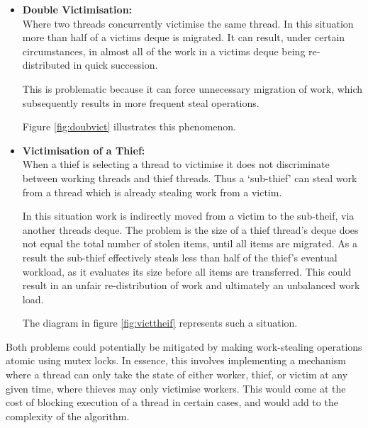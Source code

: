 \begin{itemize}
\item \textbf{Double Victimisation:} \\
        Where two threads concurrently victimise the same thread.
        In this situation more than half of a victims deque is migrated.
        It can result, under certain circumstances,
        in almost all of the work in a victims deque being re-distributed in quick succession. 
        
        This is problematic because it can force unnecessary migration of work, which subsequently results 
        in more frequent steal operations.
        
        Figure \ref{fig:doubvict} illustrates this phenomenon.
\item \textbf{Victimisation of a Thief:} \\
        When a thief is selecting a thread to victimise it does not discriminate between working threads 
        and thief threads. Thus a `sub-thief' can steal work from a thread which is already stealing work from a 
        victim.
        
        In this situation work is indirectly moved from a victim to the sub-theif, via 
        another threads deque. The problem is the size of a thief thread's deque does not equal 
        the total number of stolen items, until all items are migrated. As a result the sub-thief 
        effectively steals less than half of the thief's eventual workload, as it evaluates its size
        before all items are transferred. 
        This could result in an unfair re-distribution of work and ultimately an unbalanced work load.
        
        The diagram in figure \ref{fig:victtheif} represents such a situation.
\end{itemize}

Both problems could potentially be mitigated by making work-stealing operations atomic using mutex locks. 
In essence, this involves implementing a mechanism where a thread can only take the state of either worker, thief, or victim
at any given time, where thieves may only victimise workers. 
This would come at the cost of blocking execution of a thread in certain cases, and would add to the complexity of the algorithm.




